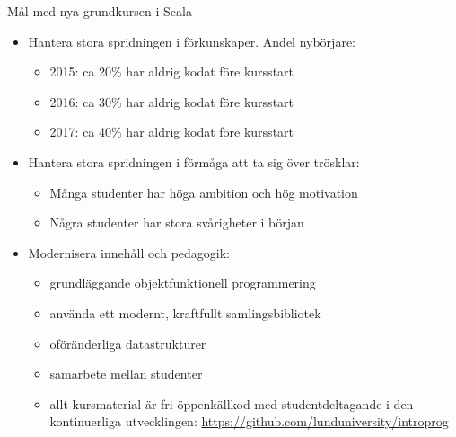 \begin{Slide}{Mål med nya grundkursen i Scala}
\begin{itemize}
  \item Hantera stora spridningen i förkunskaper. Andel nybörjare:
  \begin{itemize}
    \item 2015: ca 20\% har aldrig kodat före kursstart
    \item 2016: ca 30\% har aldrig kodat före kursstart
    \item 2017: ca 40\% har aldrig kodat före kursstart
  \end{itemize}
  \item Hantera stora spridningen i förmåga att ta sig över trösklar:
  \begin{itemize}
    \item Många studenter har höga ambition och hög motivation
    \item Några studenter har stora svårigheter i början
  \end{itemize}
  \item Modernisera innehåll och pedagogik:
  \begin{itemize}
    \item grundläggande objektfunktionell programmering
    \item använda ett modernt, kraftfullt samlingsbibliotek
    \item oföränderliga datastrukturer
    \item samarbete mellan studenter
    \item allt kursmaterial är fri öppenkällkod med studentdeltagande i den kontinuerliga utvecklingen:
    \url{https://github.com/lunduniversity/introprog}
  \end{itemize}
\end{itemize}
\end{Slide}



